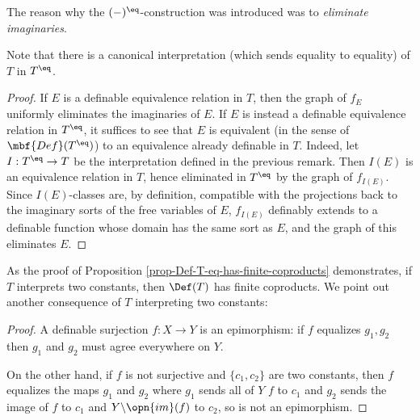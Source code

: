 The reason why the \((-)^{\eq}\)-construction was introduced was to \emph{eliminate imaginaries}.


Note that there is a canonical interpretation (which sends equality to equality) of $T$ in $T^{\eq}$.

\begin{proof}
If \(E\) is a definable equivalence relation in \(T\), then the graph of \(f_E\) uniformly eliminates the imaginaries of \(E\). If \(E\) is instead a definable equivalence relation in \(T^{\eq}\), it suffices to see that \(E\) is equivalent (in the sense of \(\mbf{Def}(T^{\eq})\)) to an equivalence already definable in \(T\). Indeed, let \(I : T^{\eq} \to T\) be the interpretation defined in the previous remark. Then \(I(E)\) is an equivalence relation in \(T\), hence eliminated in \(T^{\eq}\) by the graph of \(f_{I(E)}\). Since \(I(E)\)-classes are, by definition, compatible with the projections back to the imaginary sorts of the free variables of \(E\), \(f_{I(E)}\) definably extends to a definable function whose domain has the same sort as \(E\), and the graph of this eliminates \(E\).
\end{proof}

As the proof of Proposition \ref{prop-Def-T-eq-has-finite-coproducts} demonstrates, if $T$ interprets two constants, then $\Def(T)$ has finite coproducts. We point out another consequence of $T$ interpreting two constants:

\begin{proof}
  A definable surjection \(f : X \to Y\) is an epimorphism: if \(f\) equalizes \(g_1, g_2\) then \(g_1\) and \(g_2\) must agree everywhere on \(Y\).

On the other hand, if \(f\) is not surjective and \(\{c_1, c_2\}\) are two constants, then \(f\) equalizes the maps \(g_1\) and \(g_2\) where \(g_1\) sends all of \(Y\) \(f\) to \(c_1\) and \(g_2\) sends the image of \(f\) to \(c_1\) and \(Y \backslash \opn{im}(f)\) to \(c_2\), so is not an epimorphism.
\end{proof}


